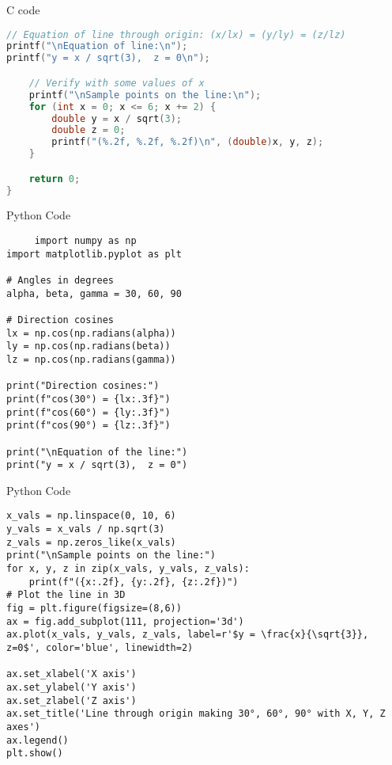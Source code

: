 \documentclass{beamer}
\begin{document}
\begin{frame}[fragile]{C code}
\begin{lstlisting}[language = c]
// Equation of line through origin: (x/lx) = (y/ly) = (z/lz)
printf("\nEquation of line:\n");
printf("y = x / sqrt(3),  z = 0\n");

    // Verify with some values of x
    printf("\nSample points on the line:\n");
    for (int x = 0; x <= 6; x += 2) {
        double y = x / sqrt(3);
        double z = 0;
        printf("(%.2f, %.2f, %.2f)\n", (double)x, y, z);
    }

    return 0;
}
\end{lstlisting}  
\end{frame}

\begin{frame}[fragile]{Python Code}
 \begin{lstlisting}
     import numpy as np
import matplotlib.pyplot as plt

# Angles in degrees
alpha, beta, gamma = 30, 60, 90

# Direction cosines
lx = np.cos(np.radians(alpha))
ly = np.cos(np.radians(beta))
lz = np.cos(np.radians(gamma))

print("Direction cosines:")
print(f"cos(30°) = {lx:.3f}")
print(f"cos(60°) = {ly:.3f}")
print(f"cos(90°) = {lz:.3f}")

print("\nEquation of the line:")
print("y = x / sqrt(3),  z = 0")
\end{lstlisting}   
\end{frame}

\begin{frame}[fragile]{Python Code}
 \begin{lstlisting}
x_vals = np.linspace(0, 10, 6)
y_vals = x_vals / np.sqrt(3)
z_vals = np.zeros_like(x_vals)
print("\nSample points on the line:")
for x, y, z in zip(x_vals, y_vals, z_vals):
    print(f"({x:.2f}, {y:.2f}, {z:.2f})")
# Plot the line in 3D
fig = plt.figure(figsize=(8,6))
ax = fig.add_subplot(111, projection='3d')
ax.plot(x_vals, y_vals, z_vals, label=r'$y = \frac{x}{\sqrt{3}}, z=0$', color='blue', linewidth=2)

ax.set_xlabel('X axis')
ax.set_ylabel('Y axis')
ax.set_zlabel('Z axis')
ax.set_title('Line through origin making 30°, 60°, 90° with X, Y, Z axes')
ax.legend()
plt.show()

\end{lstlisting}   
\end{frame}
\end{document}
